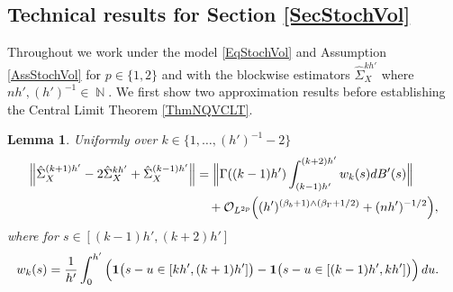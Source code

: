 \documentclass[preprint,aos]{imsart}
\numberwithin{equation}{section}
\newtheorem{lemma}[satz]{Lemma}
\theoremstyle{remark}
\DeclareMathOperator{\N}{{\mathbb N}}
\DeclareMathOperator{\PP}{{\mathbb P}}
\DeclareMathOperator{\trace}{trace}
\providecommand{\eps}{\varepsilon}
\renewcommand{\theta}{\vartheta}
\providecommand{\norm}[1]{\lVert #1 \rVert}
\providecommand{\bnorm}[1]{{\Bigl\lVert #1 \Bigr\rVert}}
\renewcommand{\le}{\leqslant}
\renewcommand{\ge}{\geqslant}
\begin{document}
\begin{appendix}
\begin{comment}
&\le \inf_{\theta>0} \exp\Big(\theta\eps+\sum_{k=0}^{K-1} \log\Big(\sum_{j=1}^{r+1}(1+2\theta \lambda_{r+1}(A_{k(r+1)+j}))^{-1/2}\Big)\Big).
\end{align*}
Set $\underline\lambda_{r+1,K}:=\min_{j=1,\ldots,K(r+1)}\lambda_{r+1}(A_j)$. We  choose $\theta=\frac 12(K\eps^{-1}-\underline\lambda_{r+1,K}^{-1})$, $\eps=tK\underline\lambda_{r+1,K}$ to obtain
\begin{align*}
&\PP\Big(\trace_{>r}\Big(\sum_{j=1}^{K(r+1)} Y_jY_j^\top\Big)\le tK\underline\lambda_{r+1,K}\Big)\\
&\le \exp\Big(\frac K2\Big(1+2\log(r+1)-t-\log(t^{-1})\Big)\Big)
\le \big(e(r+1)^2t \big)^{K/2}.
\end{align*}
The high probability bound follows by setting the deviation bound (in terms of $\eps$) to $\delta$ and solving for $\eps$, noting $\sum_{j\ge 1}Y_jY_j^\top\ge \sum_{j=1}^{K(r+1)}Y_jY_j^\top$.

\end{proof}
\end{comment}

\subsection{Technical results for Section \ref{SecStochVol}}\label{AppStochVol}

Throughout we work under the model \eqref{EqStochVol} and Assumption \ref{AssStochVol} for $p\in\{1,2\}$ and with the blockwise estimators $\hat\Sigma_X^{kh'}$ where $nh',(h')^{-1}\in\N$. We first show two approximation results before establishing the Central Limit Theorem \ref{ThmNQVCLT}.

\begin{lemma}\label{LemVolVol}
Uniformly over $k\in\{1,\ldots,(h')^{-1}-2\}$
\begin{align*}
\bnorm{\hat\Sigma_X^{(k+1)h'}-2\hat\Sigma_X^{kh'}+\hat\Sigma_X^{(k-1)h'}}
&=\bnorm{\Gamma((k-1)h')\int_{(k-1)h'}^{(k+2)h'}w_k(s)dB'(s)}\\
&\quad +{\mathcal O}_{L^{2p}}\Big((h')^{(\beta_b+1)\wedge (\beta_\Gamma+1/2)}+(nh')^{-1/2}\Big),
\end{align*}
where for $s\in[(k-1)h',(k+2)h']$
\begin{align*}
w_k(s)&=\frac1{h'}\int_{0}^{h'}\Big({\bf 1}\big(s-u\in[kh',(k+1)h']\big)-{\bf 1}\big(s-u\in[(k-1)h',kh']\big)\Big)\,du.
\end{align*}
\end{lemma}


\end{appendix}
\end{document}
